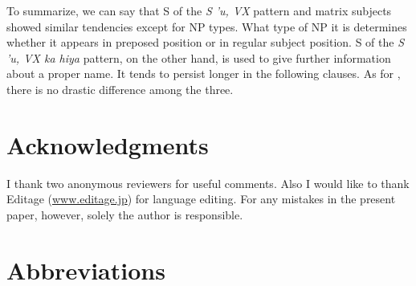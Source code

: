 \documentclass[output=paper
,modfonts
,nonflat]{langsci/langscibook}
\begin{document}
To summarize, we can say that S of the \textit{S 'u, VX} pattern and matrix subjects showed similar tendencies except for NP types. What type of NP it is determines whether it appears in preposed position or in regular subject position. S of the \textit{S 'u, VX ka hiya} pattern, on the other hand, is used to give further information about a proper name. It tends to persist longer in the following clauses. As for , there is no drastic difference among the three.

\section*{Acknowledgments}

I thank two anonymous reviewers for useful comments. Also I would like to thank Editage (\href{http://www.editage.jp}{www.editage.jp}) for  language editing. For any mistakes in the present paper, however, solely the author is responsible.

\section*{Abbreviations}
\end{document}
